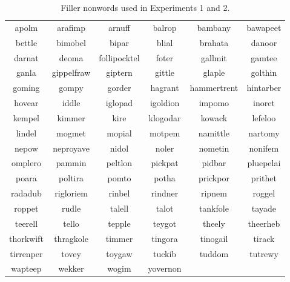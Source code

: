 \begin{table}[h]
\caption{Filler nonwords used in Experiments 1 and 2.}
\label{tbl:fillernonwords}
\centering
\begin{tabular}{cccccc}
\toprule
apolm     & arafimp    & arnuff       & balrop   & bambany     & bawapeet  \\
bettle    & bimobel    & bipar        & blial    & brahata     & danoor    \\
darnat    & deoma      & follipocktel & foter    & gallmit     & gamtee    \\
ganla     & gippelfraw & giptern      & gittle   & glaple      & golthin   \\
goming    & gompy      & gorder       & hagrant  & hammertrent & hintarber \\
hovear    & iddle      & iglopad      & igoldion & impomo      & inoret    \\
kempel    & kimmer     & kire         & klogodar & kowack      & lefeloo   \\
lindel    & mogmet     & mopial       & motpem   & namittle    & nartomy   \\
nepow     & neproyave  & nidol        & noler    & nometin     & nonifem   \\
omplero   & pammin     & peltlon      & pickpat  & pidbar      & pluepelai \\
poara     & poltira    & pomto        & potha    & prickpor    & prithet   \\
radadub   & rigloriem  & rinbel       & rindner  & ripnem      & roggel    \\
roppet    & rudle      & talell       & talot    & tankfole    & tayade    \\
teerell   & tello      & tepple       & teygot   & theely      & theerheb  \\
thorkwift & thragkole  & timmer       & tingora  & tinogail    & tirack    \\
tirrenper & tovey      & toygaw       & tuckib   & tuddom      & tutrewy   \\
wapteep   & wekker     & wogim        & yovernon &             &          \\
\bottomrule
\end{tabular}
\end{table}


